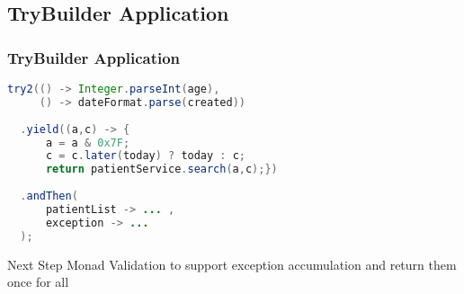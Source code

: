 \documentclass{beamer}
\begin{document}
\subsection{TryBuilder Application}
\begin{frame}[fragile]
  \frametitle{TryBuilder Application}
\begin{lstlisting}[language=Java]
try2(() -> Integer.parseInt(age), 
     () -> dateFormat.parse(created))
     
  .yield((a,c) -> {
      a = a & 0x7F;
      c = c.later(today) ? today : c;
      return patientService.search(a,c);})
  
  .andThen(
      patientList -> ... ,
      exception -> ...
  );
\end{lstlisting}
  \begin{block}{Next Step}
  \alert{Monad Validation} to support exception accumulation and return them once for all
  \end{block}
\end{frame}
\end{document}
